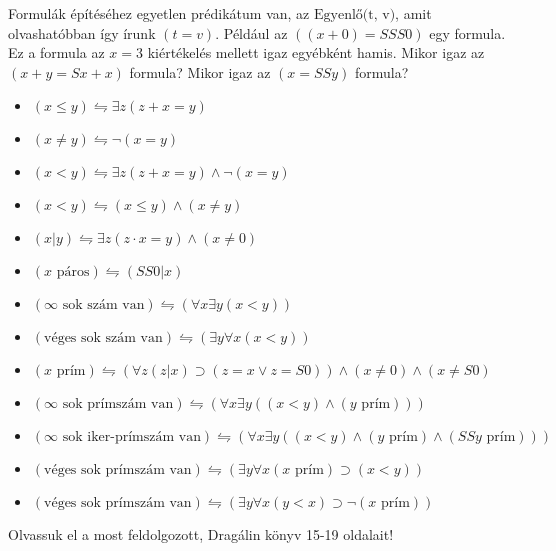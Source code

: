 \documentclass{article}
\begin{document}
Formulák építéséhez egyetlen prédikátum van, az $\text{Egyenlő(t, v)}$, amit olvashatóbban így írunk $(t=v)$.
Például az $((x+0) = SSS0)$ egy formula. Ez a formula az $x=3$ kiértékelés mellett igaz egyébként hamis.
Mikor igaz az $(x+y = Sx+x)$ formula? Mikor igaz az $(x = SSy)$ formula?

\begin{itemize}
\item
$ (x \le y) \leftrightharpoons \exists z(z+x=y)$ 

\item
$ (x \neq y) \leftrightharpoons  \neg (x=y)$ 

\item
$ (x < y) \leftrightharpoons \exists z(z+x=y) \wedge \neg (x=y)$ 

\item
$ (x < y) \leftrightharpoons  (x \le y )\wedge ( x \neq y)$ 

\item
$(x \vert y) \leftrightharpoons \exists z ( z \cdot x=y )\wedge ( x \neq 0)$ 

\item
$ (x \text{ páros}) \leftrightharpoons (SS0 \vert x)$ 

\item
$ (\infty \text{ sok szám van}) \leftrightharpoons (\forall x \exists y (x<y))$ 

\item
$ (\text{véges sok szám van}) \leftrightharpoons ( \exists y \forall x (x<y))$ 

\item
$ (x \text{ prím}) \leftrightharpoons  (\forall z( z \vert x )\supset ( z = x \vee z=S0))\wedge ( x \neq 0)\wedge ( x \neq S0)$ 

\item
$ (\infty \text{ sok prímszám van}) \leftrightharpoons (\forall x \exists y ((x<y)\wedge(y \text{ prím}))) $ 

\item
$ (\infty \text{ sok iker-prímszám van}) \leftrightharpoons   (\forall x \exists y ((x<y)\wedge(y \text{ prím})\wedge(SSy \text{ prím})))$ 

\item
$ (\text{véges sok prímszám van}) \leftrightharpoons   ( \exists y \forall x (x \text{ prím}) \supset (x<y)) $ 

\item
$ (\text{véges sok prímszám van}) \leftrightharpoons   ( \exists y \forall x (y<x) \supset \neg (x \text{ prím})) $ 

 \end{itemize}

Olvassuk el a most feldolgozott, Dragálin könyv 15-19 oldalait!
\end{document}
